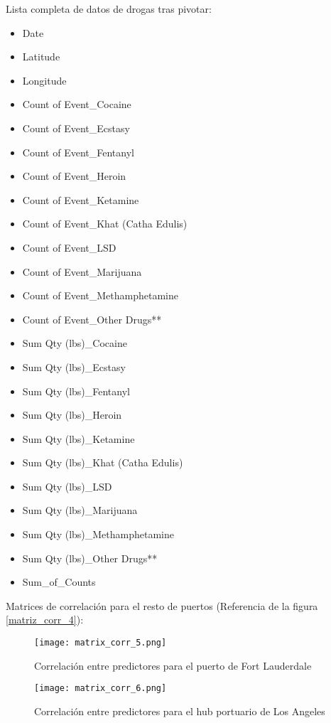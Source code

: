 \documentclass[12pt]{article}
\begin{document}
Lista completa de datos de drogas tras pivotar:
\begin{itemize}
	\item Date
	\item Latitude
	\item Longitude
	\item Count of Event\_Cocaine
	\item Count of Event\_Ecstasy
	\item Count of Event\_Fentanyl
	\item Count of Event\_Heroin
	\item Count of Event\_Ketamine
	\item Count of Event\_Khat (Catha Edulis)
	\item Count of Event\_LSD
	\item Count of Event\_Marijuana
	\item Count of Event\_Methamphetamine
	\item Count of Event\_Other Drugs**
	\item Sum Qty (lbs)\_Cocaine
	\item Sum Qty (lbs)\_Ecstasy
	\item Sum Qty (lbs)\_Fentanyl
	\item Sum Qty (lbs)\_Heroin
	\item Sum Qty (lbs)\_Ketamine
	\item Sum Qty (lbs)\_Khat (Catha Edulis)
	\item Sum Qty (lbs)\_LSD
	\item Sum Qty (lbs)\_Marijuana
	\item Sum Qty (lbs)\_Methamphetamine
	\item Sum Qty (lbs)\_Other Drugs**
	\item Sum\_of\_Counts
\end{itemize}

\newpage
Matrices de correlación para el resto de puertos (Referencia de la figura \ref{matriz_corr_4}):

\begin{figure}[H]
	\caption{\label{matriz_corr_5} Correlación entre predictores para el puerto de Fort Lauderdale}
	\centering
	\hspace*{1cm}
	\texttt{[image: matrix\_corr\_5.png]}
\end{figure}

\begin{figure}[H]
	\caption{\label{matriz_corr_6} Correlación entre predictores para el hub portuario de Los Angeles}
	\centering
	\hspace*{1cm}
	\texttt{[image: matrix\_corr\_6.png]}
\end{figure}
\end{document}
